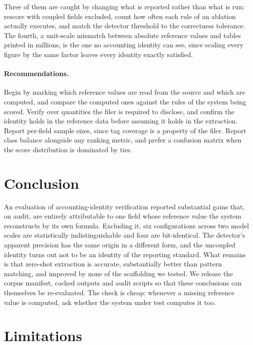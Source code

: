 \documentclass[11pt]{article}
\begin{document}
Three of them are caught by changing what is reported rather than what is run: rescore
with coupled fields excluded, count how often each rule of an ablation actually executes,
and match the detector threshold to the correctness tolerance. The fourth, a unit-scale
mismatch between absolute reference values and tables printed in millions, is the one no
accounting identity can see, since scaling every figure by the same factor leaves every
identity exactly satisfied.


\paragraph{Recommendations.} Begin by marking which reference values are read from the
source and which are computed, and compare the computed ones against the rules of the
system being scored. Verify over quantities the filer is required to disclose,
and confirm the identity holds in the reference data before assuming it holds in the
extraction. Report per-field sample sizes, since tag coverage is a property of the
filer. Report class balance alongside any ranking metric, and prefer a confusion matrix
when the score distribution is dominated by ties.

\section{Conclusion}

An evaluation of accounting-identity verification reported substantial gains that, on
audit, are entirely attributable to one field whose reference value the system
reconstructs by its own formula. Excluding it, six configurations across two model
scales are statistically indistinguishable and four are bit-identical. The detector's
apparent precision has the same origin in a different form, and the uncoupled identity
turns out not to be an identity of the reporting standard. What remains is that
zero-shot extraction is accurate, substantially better than pattern matching, and
improved by none of the scaffolding we tested. We release the corpus manifest, cached
outputs and audit scripts so that these conclusions can themselves be re-evaluated.
The check is cheap: whenever a missing reference value is computed, ask whether the system under
test computes it too.

\section*{Limitations}
\label{sec:limitations}
\end{document}
